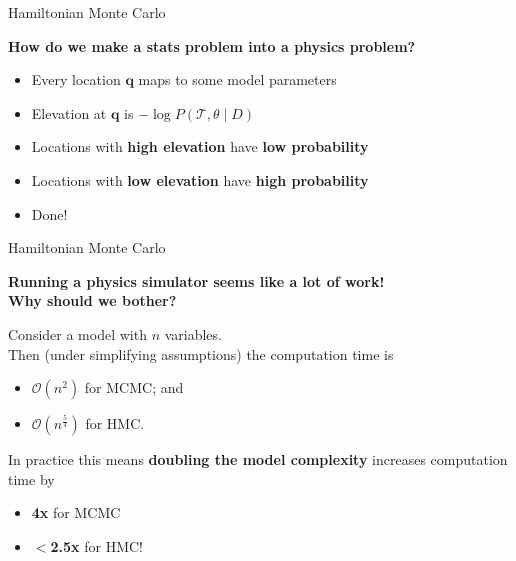 \documentclass{beamer}
\renewcommand{\vec}[1]{\ensuremath{\boldsymbol{\mathbf{#1}}}}
\begin{document}
    \begin{frame}{Hamiltonian Monte Carlo}
    
    \textbf{How do we make a stats problem into a physics problem?}
    \pause
    \begin{itemize}
    	\item Every location $\vec q$ maps to some model parameters
			\item Elevation at $\vec q$ is $-\log{P\left(\mathcal{T}, \theta \mid D\right)}$
    	\item Locations with \textbf{high elevation} have \textbf{low probability}
			\item Locations with \textbf{low elevation} have \textbf{high probability}
			\item Done!
    \end{itemize}
    
    \end{frame}

    \begin{frame}{Hamiltonian Monte Carlo}

        \textbf{Running a physics simulator seems like a lot of work! \\ Why should we bother?}

        \pause

        \begin{theorem}[Creutz 1988]
            Consider a model with $n$ variables. \\
            Then (under simplifying assumptions) the computation time is
            \begin{itemize}
                \item $\mathcal{O}\left(n^2\right)$ for MCMC; and
                \item $\mathcal{O}\left(n^\frac{5}{4}\right)$ for HMC.
            \end{itemize}
        \end{theorem}

        \pause

        In practice this means \textbf{doubling the model complexity} increases computation time by
        \begin{itemize}
            \item \textbf{4x} for MCMC
            \item \textbf{$<$2.5x} for HMC!
        \end{itemize}

    \end{frame}
\end{document}

